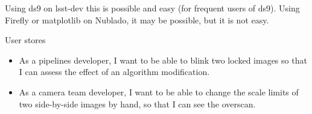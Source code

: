 Using ds9 on lsst-dev this is possible and easy (for frequent users of ds9).
Using Firefly or matplotlib on Nublado, it may be possible, but it is not easy.

User stores
\begin{itemize}
\item{As a pipelines developer,  I want to be able to blink two locked images so that I can assess the effect of an algorithm modification.}
\item{As a camera team developer,  I want to be able to change the scale limits of two side-by-side images by hand, so that I can see the overscan.}
\end{itemize}

